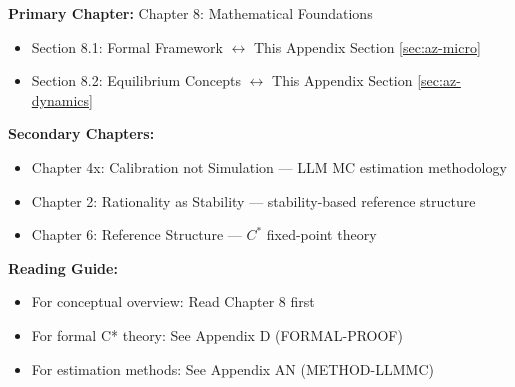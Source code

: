 %
%

%
%
%
%

\begin{tcolorbox}[colback=purple!5!white, colframe=purple!75!black,
    title=Chapter Linkage]

\textbf{Primary Chapter:} Chapter 8: Mathematical Foundations
\begin{itemize}[nosep]
\item Section 8.1: Formal Framework $\leftrightarrow$ This Appendix Section \ref{sec:az-micro}
\item Section 8.2: Equilibrium Concepts $\leftrightarrow$ This Appendix Section \ref{sec:az-dynamics}
\end{itemize}

\textbf{Secondary Chapters:}
\begin{itemize}[nosep]
\item Chapter 4x: Calibration not Simulation --- LLM MC estimation methodology
\item Chapter 2: Rationality as Stability --- stability-based reference structure
\item Chapter 6: Reference Structure --- $C^*$ fixed-point theory
\end{itemize}

\textbf{Reading Guide:}
\begin{itemize}[nosep]
\item For conceptual overview: Read Chapter 8 first
\item For formal C* theory: See Appendix D (FORMAL-PROOF)
\item For estimation methods: See Appendix AN (METHOD-LLMMC)
\end{itemize}

\end{tcolorbox}


